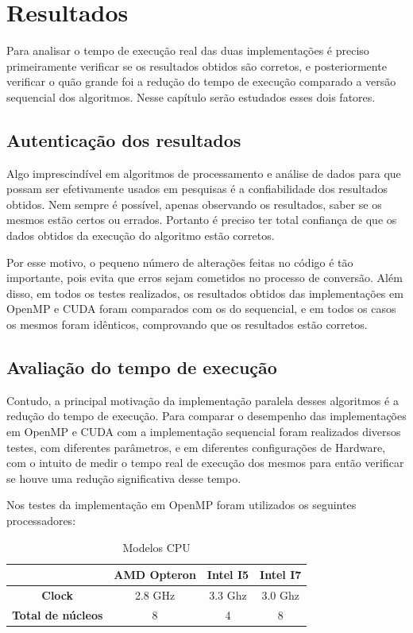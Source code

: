 \chapter{Resultados}

Para analisar o tempo de execução real das duas implementações é preciso primeiramente verificar se os resultados obtidos são corretos, e posteriormente verificar o quão grande foi a redução do tempo de execução comparado a versão sequencial dos algoritmos. Nesse capítulo serão estudados esses dois fatores.

\section{Autenticação dos resultados}

Algo imprescindível em algoritmos de processamento e análise de dados para que possam ser efetivamente usados em pesquisas é a confiabilidade dos resultados obtidos. Nem sempre é possível, apenas observando os resultados, saber se os mesmos estão certos ou errados. Portanto é preciso ter total confiança de que os dados obtidos da execução do algoritmo estão corretos.

Por esse motivo, o pequeno número de alterações feitas no código é tão importante, pois evita que erros sejam cometidos no processo de conversão. Além disso, em todos os testes realizados, os resultados obtidos das implementações em OpenMP e CUDA foram comparados com os do sequencial, e em todos os casos os mesmos foram idênticos, comprovando que os resultados estão corretos.

\section{Avaliação do tempo de execução}

Contudo, a principal motivação da implementação paralela desses algoritmos é a redução do tempo de execução. Para comparar o desempenho das implementações em OpenMP e CUDA com a implementação sequencial foram realizados diversos testes, com diferentes parâmetros, e em diferentes configurações de Hardware, com o intuito de medir o tempo real de execução dos mesmos para então verificar se houve uma redução significativa desse tempo.

Nos testes da implementação em OpenMP foram utilizados os seguintes processadores:

\begin{table}[H]
\caption{Modelos CPU}
\begin{center}
\begin{tabular}{cccc}
 & \textbf{AMD Opteron} & \textbf{Intel I5} & \textbf{Intel I7} \\
\hline\hline
\textbf{Clock}				& 2.8 GHz	& 3.3 Ghz	& 3.0 Ghz \\
\textbf{Total de núcleos}	& 8			& 4			& 8
\end{tabular} 
\end{center}
\end{table}

